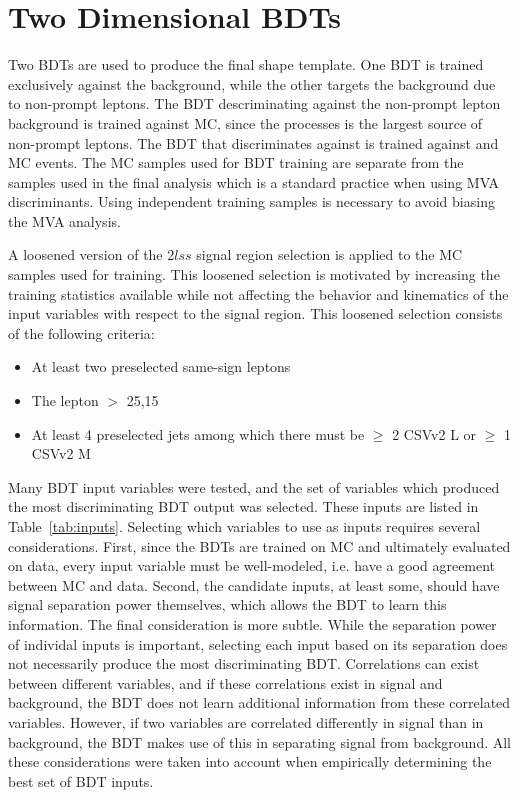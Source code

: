 \section{Two Dimensional BDTs}
\label{sec:2D_BDT}
Two BDTs are used to produce the final shape template. One BDT is trained exclusively against the \ttv background, while the other targets the background due to non-prompt
leptons. The BDT descriminating against the non-prompt lepton background is trained against \ttbar MC, since the \ttbar processes is the largest source of non-prompt leptons.
The BDT that discriminates against \ttv is trained against \ttw and \ttz MC events. The MC samples used for BDT training are separate from the samples used in the final
analysis which is a standard practice when using MVA discriminants. Using independent training samples is necessary to avoid biasing the MVA analysis. 

A loosened version of the $2lss$ signal region selection is applied to the MC samples used for training. This loosened selection is motivated by increasing the training statistics available
while not affecting the behavior and kinematics of the input variables with respect to the signal region. This loosened selection consists of the following criteria:
\begin{itemize}
\item At least two preselected same-sign leptons
\item The lepton \pt $>$ 25,15 
\item At least 4 preselected jets among which there must be $\geq$ 2 CSVv2 L or $\geq$ 1 CSVv2 M
\end{itemize}

Many BDT input variables were tested, and the set of variables which produced the most discriminating BDT output was selected. These inputs are listed in Table~\ref{tab:inputs}.
Selecting which variables to use as inputs requires several considerations. First, since the BDTs are trained on MC and ultimately evaluated on data, every
input variable must be well-modeled, i.e. have a good agreement between MC and data. Second, the candidate inputs, at least some, should have signal separation power themselves,
which allows the BDT to learn this information. The final consideration is more subtle. While the separation power of individal inputs is important, selecting each input
based on its separation does not necessarily produce the most discriminating BDT. Correlations can exist between different variables, and if these correlations exist in
signal and background, the BDT does not learn additional information from these correlated variables. However, if two variables are correlated differently in signal
than in background, the BDT makes use of this in separating signal from background. All these considerations were taken into account when empirically determining the best
set of BDT inputs.

